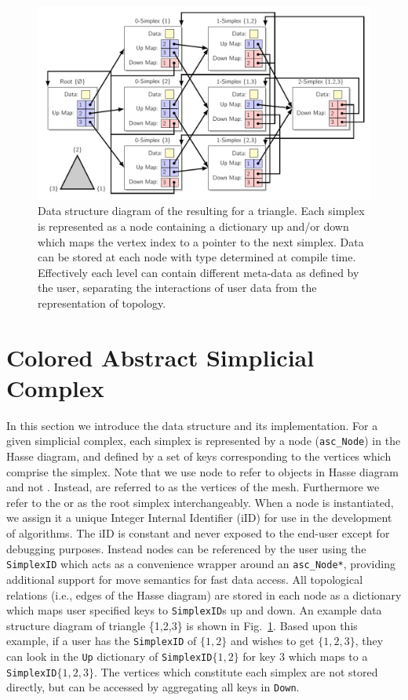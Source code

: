 \begin{figure}[ht!]
	\centering
	\includegraphics[width=\textwidth]{Figures/datastructure/ds}
	\caption{Data structure diagram of the resulting \asc for a triangle. Each simplex is represented as a node containing a dictionary up and/or down which maps the vertex index to a pointer to the next simplex. Data can be stored at each node with type determined at compile time. Effectively each level can contain different meta-data as defined by the user, separating the interactions of user data from the representation of topology.}
	\label{fig:datastruct}
\end{figure}

\section{Colored Abstract Simplicial Complex}\label{sec:casc}

\par In this section we introduce the \asc data structure and its implementation.
For a given simplicial complex, each simplex is represented by a node (\verb|asc_Node|) in the Hasse diagram, and defined by a set of keys corresponding to the vertices which comprise the simplex.
Note that we use node to refer to objects in \asc Hasse diagram and not . Instead,  are referred to as the vertices of the mesh.
Furthermore we refer to the \simplex{\varnothing} or  as the root simplex interchangeably.
When a node is instantiated, we assign it a unique Integer Internal Identifier (iID) for use in the development of \asc algorithms.
The iID is constant and never exposed to the end-user except for debugging purposes.
Instead nodes can be referenced by the user using the \verb|SimplexID| which acts as a convenience wrapper around an \verb|asc_Node*|, providing additional support for move semantics for fast data access.
All topological relations (i.e., edges of the Hasse diagram) are stored in each node as a dictionary which maps user specified keys to \verb|SimplexID|s up and down.
An example data structure diagram of triangle \{1,2,3\} is shown in Fig.~\ref{fig:datastruct}.
Based upon this example, if a user has the \verb|SimplexID| of  $\{1,2\}$ and wishes to get  $\{1,2,3\}$, they can look in the \verb|Up| dictionary of \verb|SimplexID|$\{1,2\}$ for key $3$ which maps to a \verb|SimplexID|$\{1,2,3\}$.
The vertices which constitute each simplex are not stored directly, but can be accessed by aggregating all keys in \verb|Down|.

